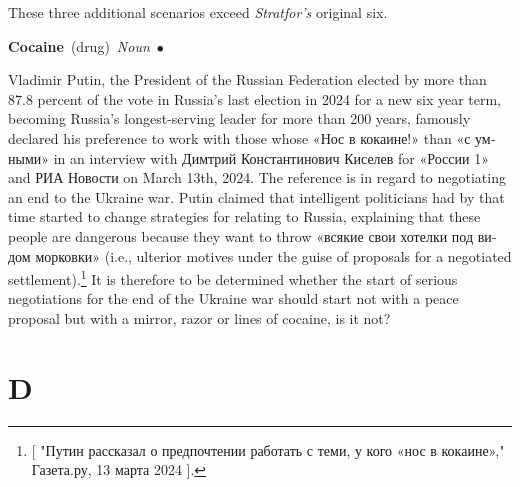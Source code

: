 \documentclass[10pt,a4paper,twoside]{article} %
\newcommand{\entry}[4]{\markboth{#1}{#1}\textbf{#1}\ {(#2)}\ \textit{#3}\ $\bullet$\ {#4}}  %
\begin{document}
\begin{multicols}{2}
{These three additional scenarios exceed \emph{Stratfor's} original six. 

}

\entry{Cocaine} {drug} {Noun} {Vladimir Putin, the President of the Russian Federation elected by more than 87.8 percent of the vote in Russia's last election in 2024 for a new six year term, becoming Russia's longest-serving leader for more than 200 years, famously declared his preference to work with those whose \textrussian{«Нос в кокаине!»} than \textrussian{«с умными»} in an interview with \textrussian{Димтрий Константинович Киселев} for \textrussian{«России 1»} and \textrussian{РИА Новости} on March 13th, 2024. The reference is in regard to negotiating an end to the Ukraine war. 
\newline \indent Putin claimed that intelligent politicians had by that time started to change strategies for relating to Russia, explaining that these people are dangerous because they want to throw \textrussian{«всякие свои хотелки под видом морковки»} (i.e., ulterior motives under the guise of proposals for a negotiated settlement).\footnote{ [ \textrussian{"Путин рассказал о предпочтении работать с теми, у кого «нос в кокаине»," Газета.ру,  13 марта 2024} ]. } It is therefore to be determined whether the start of serious negotiations for the end of the Ukraine war should start not with a peace proposal but with a mirror, razor or lines of cocaine, is it not? 

}


\end{multicols}



\section*{D}
\end{document}

